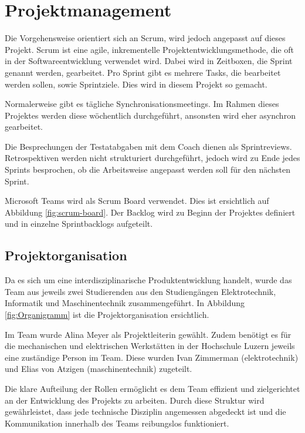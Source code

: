 \section{Projektmanagement}

Die Vorgehensweise orientiert sich an Scrum, wird jedoch angepasst auf dieses Projekt.
Scrum ist eine agile, inkrementelle Projektentwicklungsmethode, die oft in der Softwareentwicklung verwendet wird. Dabei wird in Zeitboxen, die Sprint genannt werden, gearbeitet. Pro Sprint gibt es mehrere Tasks, die bearbeitet werden sollen, sowie Sprintziele. Dies wird in diesem Projekt so gemacht.\cite{wikipedia-scrum}

Normalerweise gibt es tägliche Synchronisationsmeetings. Im Rahmen dieses Projektes werden diese wöchentlich durchgeführt, ansonsten wird eher asynchron gearbeitet.

Die Besprechungen der Testatabgaben mit dem Coach dienen als Sprintreviews. Retrospektiven werden nicht strukturiert durchgeführt, jedoch wird zu Ende jedes Sprints besprochen, ob die Arbeitsweise angepasst werden soll für den nächsten Sprint.

Microsoft Teams wird als Scrum Board verwendet. Dies ist ersichtlich auf Abbildung \ref{fig:scrum-board}. Der Backlog wird zu Beginn der Projektes definiert und in einzelne Sprintbacklogs aufgeteilt.

\subsection{Projektorganisation}

Da es sich um eine interdisziplinarische Produktentwicklung handelt, wurde das Team aus jeweils zwei Studierenden aus den Studiengängen Elektrotechnik, Informatik und Maschinentechnik zusammengeführt. In Abbildung \ref{fig:Organigramm} ist die Projektorganisation ersichtlich. 

Im Team wurde Alina Meyer als Projektleiterin gewählt. Zudem benötigt es für die mechanischen und elektrischen Werkstätten in der Hochschule Luzern jeweils eine zuständige Person im Team. Diese wurden Ivan Zimmerman (\acrshort{elektrotechnik}) und Elias von Atzigen (\acrshort{maschinentechnik}) zugeteilt.

Die klare Aufteilung der Rollen ermöglicht es dem Team effizient und zielgerichtet an der Entwicklung des Projekts zu arbeiten. Durch diese Struktur wird gewährleistet, dass jede technische Disziplin angemessen abgedeckt ist und die Kommunikation innerhalb des Teams reibungslos funktioniert.

